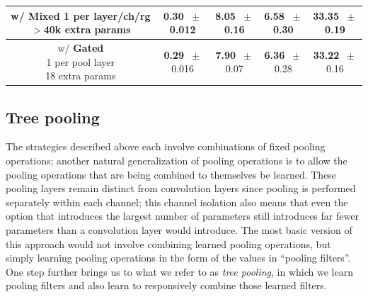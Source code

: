 \documentclass[twoside]{article}
\begin{document}
\begin{table}[!htp]
\begin{center}
\begin{tabular}{c | c | c | c | c }
\hline
\shortstack{w/ \textbf{Mixed} \\ {\tiny 1 per layer/ch/rg} \\{\tiny $>$40k extra params} } &\shortstack{ 0.30 \\ {\tiny $\:\pm$ 0.012}}  & \shortstack{ 8.05 \\ {\tiny $\:\pm$ 0.16}}    &  \shortstack{ 6.58 \\ {\tiny $\:\pm$ 0.30}}                   &  \shortstack{ 33.35 \\ {\tiny $\:\pm$ 0.19}}            \\
\hline
\shortstack{w/ \textbf{Gated} \\ {\tiny 1 per pool layer} \\ {\tiny 18 extra params} }  & \shortstack{\textbf{0.29} \\ {\tiny $\:\pm$ 0.016}}   & \shortstack{\textbf{7.90} \\ {\tiny $\:\pm$ 0.07}}   & \shortstack{\textbf{6.36} \\ {\tiny $\:\pm$ 0.28}}          & \shortstack{\textbf{33.22} \\ {\tiny $\:\pm$ 0.16}}   \\
\hline
\end{tabular}
\end{center}
\vspace{-4mm}
\end{table}
\vspace{-2mm}
\subsection{Tree pooling}
\vspace{-2mm}
The strategies described above each involve combinations of fixed pooling operations;
another natural generalization of pooling operations is to allow the pooling operations
that are being combined to themselves be learned.  These pooling layers remain distinct from convolution 
layers since pooling is performed separately within each channel; this channel isolation also means 
that even the option that introduces the largest number of parameters still introduces far fewer parameters 
than a convolution layer would introduce. The most basic version of this 
approach would not involve combining learned pooling operations, but simply learning pooling operations 
in the form of the values in “pooling filters”. One step further brings us to what 
we refer to as \emph{tree pooling}, in which we learn pooling filters and also learn 
to responsively combine those learned filters. 
\end{document}
